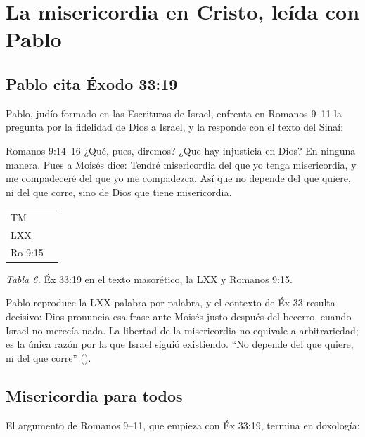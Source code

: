 \section{La misericordia en Cristo, leída con Pablo}

\subsection{Pablo cita Éxodo 33:19}
Pablo, judío formado en las Escrituras de Israel, enfrenta en Romanos 9--11 la pregunta por la fidelidad de Dios a Israel, y la responde con el texto del Sinaí:

\begin{verso}{Romanos 9:14–16}
¿Qué, pues, diremos? ¿Que hay injusticia en Dios? En ninguna manera. Pues a Moisés dice: Tendré misericordia del que yo tenga misericordia, y me compadeceré del que yo me compadezca. Así que no depende del que quiere, ni del que corre, sino de Dios que tiene misericordia.
\end{verso}

\begin{center}\small\renewcommand{\arraystretch}{1.25}
\begin{tabular}{@{}L{1.8cm}L{12.4cm}@{}}
\toprule
TM &  \\
LXX &  \\
Ro 9:15 &  \\
\bottomrule
\end{tabular}\par
{\footnotesize\color{gris}\textit{Tabla 6.} Éx 33:19 en el texto masorético, la LXX y Romanos 9:15.}
\end{center}

Pablo reproduce la LXX palabra por palabra, y el contexto de Éx 33 resulta decisivo: Dios pronuncia esa frase ante Moisés justo después del becerro, cuando Israel no merecía nada. La libertad de la misericordia no equivale a arbitrariedad; es la única razón por la que Israel siguió existiendo. ``No depende del que quiere, ni del que corre'' ().

\subsection{Misericordia para todos}
El argumento de Romanos 9--11, que empieza con Éx 33:19, termina en doxología:

